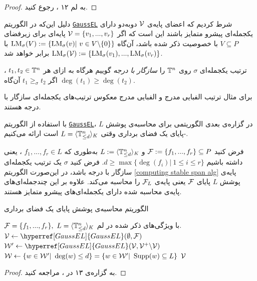 \begin{proof}
به لم ۱۲ 
{\small \cite{kehrein2006computing}}
، رجوع کنید.
\end{proof}

دلیل این‌که در الگوریتم 
\hyperref[GaussEL]{\texttt{GaussEL}}
شرط کردیم که اعضای پایه‌ی 
${\mathcal V}$
دوبه‌دو دارای یکجمله‌ای پیشرو متمایز باشند این است که اگر 
${\mathcal V} = \{v_{1},...,v_{r}\}$
پایه‌ای برای زیرفضای 
$V\subseteq P$
با خصوصیت ذکر شده باشد، آن‌گاه 
$\operatorname{\mathrm{LM}}_{\sigma}(V):=\{\operatorname{\mathrm{LM}}_{\sigma}(v)| \ v\in
 V\backslash\{0\}\}$
 با 
 $\operatorname{\mathrm{LM}}_{\sigma}({\mathcal V}):= \{\operatorname{\mathrm{LM}}_{\sigma}(v_{1}),...,\operatorname{\mathrm{LM}}_{\sigma}(v_{r})\}$
 برابر خواهد شد. 
 
 \begin{definition}
ترتیب یکجمله‌ای
$\sigma$
روی 
${\mathbb{T}}^{n}$
را
\textit{سازگار با درجه}
گوییم هرگاه به ازای هر 
$t_{1},t_{2}\in{\mathbb{T}}^{n}$
، اگر 
$t_{1}\geq_{\sigma} t_{2}$
آن‌گاه 
$\deg(t_{1})\geq \deg(t_{2})$.
 \end{definition}
 برای مثال ترتیب الفبایی مدرج و الفبایی مدرج معکوس ترتیب‌های یکجمله‌ای سازگار با درجه هستند.
 
 با استفاده از الگوریتم 
 \hyperref[GaussEL]{\texttt{GaussEL}}،
 در گزاره‌ی بعدی الگوریتمی برای محاسبه‌ی پوشش 
 $L$
 -پایای یک فضای برداری وقتی 
 $L = \langle {\mathbb{T}}^{n}_{\leq d} \rangle_{K}$
 است ارائه می‌کنیم. 
 
\begin{proposition}
\label{stable span coputation}
فرض کنید 
${\mathcal F} := \{f_{1},...,f_{r}\}\subseteq P$
و
$L:=\langle {\mathbb{T}}^{n}_{\leq d} \rangle_{\textit{K}}$
به‌طوری که 
$f_{1},...,f_{r}\in L$
، یعنی داشته باشیم 
$d\geq \max\{\deg(f_{i})| \ 1\leq i\leq r\}$.
فرض کنید 
$\sigma$
یک ترتیب یکجمله‌ای سازگار با درجه باشد، در این‌صورت الگوریتم 
\ref{computing stable span alg}
پایه‌ی پوشش 
$L$
پایای 
${\mathcal F}$
یعنی پایه‌ی 
${\mathcal F}_{L}$
را محاسبه‌ می‌کند. علاوه بر این چندجمله‌ای‌های پایه‌ی محاسبه شده دارای یکجمله‌ای‌های پیشرو متمایز هستند. 

\renewcommand{\algorithmicrequire}{\textbf{Input}}
\renewcommand{\algorithmicensure}{\textbf{Output}}
\begin{algorithm}[]
	\caption{الگوریتم محاسبه‌ی پوشش پایای یک فضای برداری}
	\label{computing stable span alg}
	\begin{latin}	
	\begin{algorithmic}[]				
		\REQUIRE ${\mathcal F} = \{f_{1},...,f_{r}\}, \ L = \langle {\mathbb{T}}^{n}_{\leq d} \rangle_{K}$
		با ویژگی‌های ذکر شده در لم.
		\ENSURE {}
\STATE $\mV\gets \hyperref[GaussEL]{GaussEL}(\emptyset, \mF)$		
\REPEAT 
\STATE $\mW'\gets \hyperref[GaussEL]{GaussEL}(\mV, \mV^{+}\backslash \mV)$
\STATE ${\mathcal W}\gets  \{w\in{\mathcal W}'| \ \deg(w)\leq d\} = \{w\in{\mathcal W}'| \ \operatorname{\mathrm{Supp}}(w)\subseteq L\}$
\UNTIL{$\mW \neq \emptyset$}
\RETURN ${\mathcal V}$		
\end{algorithmic}
\end{latin}
\end{algorithm}

\end{proposition}
\begin{proof}
به گزاره‌ی ۱۳ در 
{\small \cite{kehrein2006computing}}
، مراجعه کنید. 
\end{proof}

